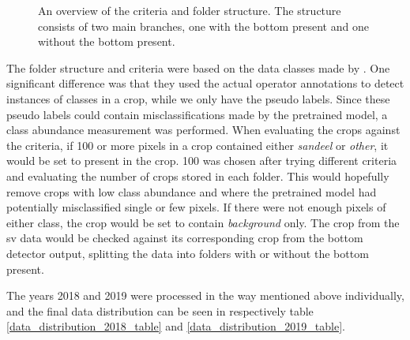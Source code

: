         
        \begin{figure}[H]
            \centering
            
            


            \caption[Criteria and folder structure]{An overview of the criteria and folder structure. The structure consists of two main branches, one with the bottom present and one without the bottom present.}
            
            
          	\medskip 
            \label{data_hierarchy_fig}
        \end{figure}
        

        
        The folder structure and criteria were based on the data classes made by \citeauthor{brautaset2020acoustic}\cite{brautaset2020acoustic}. One significant difference was that they used the actual operator annotations to detect instances of classes in a crop, while we only have the pseudo labels. Since these pseudo labels could contain misclassifications made by the pretrained model, a class abundance measurement was performed. When evaluating the crops against the criteria, if 100 or more pixels in a crop contained either \textit{sandeel} or \textit{other}, it would be set to present in the crop. 100 was chosen after trying different criteria and evaluating the number of crops stored in each folder. This would hopefully remove crops with low class abundance and where the pretrained model had potentially misclassified single or few pixels. If there were not enough pixels of either class, the crop would be set to contain \textit{background} only. The crop from the \gls{sv} data would be checked against its corresponding crop from the bottom detector output, splitting the data into folders with or without the bottom present.
        
        The years 2018 and 2019 were processed in the way mentioned above individually, and the final data distribution can be seen in respectively table \ref{data_distribution_2018_table} and \ref{data_distribution_2019_table}.



